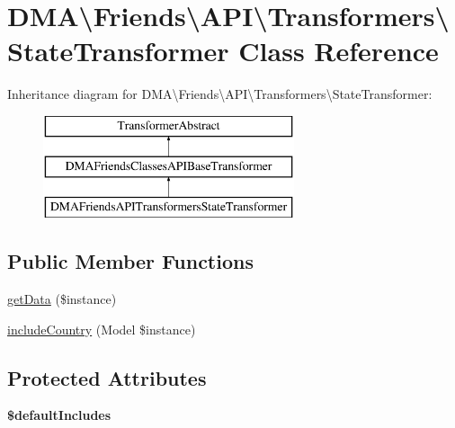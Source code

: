 \hypertarget{classDMA_1_1Friends_1_1API_1_1Transformers_1_1StateTransformer}{}\section{D\+M\+A\textbackslash{}Friends\textbackslash{}A\+P\+I\textbackslash{}Transformers\textbackslash{}State\+Transformer Class Reference}
\label{classDMA_1_1Friends_1_1API_1_1Transformers_1_1StateTransformer}
Inheritance diagram for D\+M\+A\textbackslash{}Friends\textbackslash{}A\+P\+I\textbackslash{}Transformers\textbackslash{}State\+Transformer\+:\begin{figure}[H]
\begin{center}
\leavevmode
\includegraphics[height=3.000000cm]{de/de0/classDMA_1_1Friends_1_1API_1_1Transformers_1_1StateTransformer}
\end{center}
\end{figure}
\subsection*{Public Member Functions}
\begin{DoxyCompactItemize}
\item 
\hyperlink{classDMA_1_1Friends_1_1API_1_1Transformers_1_1StateTransformer_a46336282d30845ae189715cfee04be15}{get\+Data} (\$instance)
\item 
\hyperlink{classDMA_1_1Friends_1_1API_1_1Transformers_1_1StateTransformer_aa5b7cf3a2ea5908778ee989979295e35}{include\+Country} (Model \$instance)
\end{DoxyCompactItemize}
\subsection*{Protected Attributes}
\begin{DoxyCompactItemize}
\item 
{\bfseries \$default\+Includes}
\end{DoxyCompactItemize}


